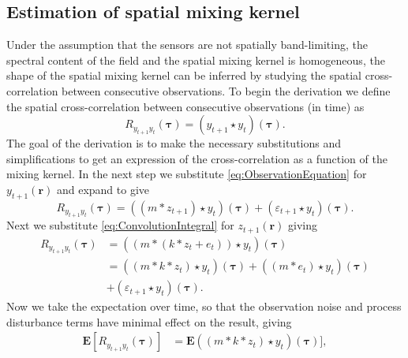 \documentclass[10pt,twocolumn,twoside]{IEEEtran}
\begin{document}
\subsection{Estimation of spatial mixing kernel} 
Under the assumption that the sensors are not spatially band-limiting, the spectral content of the field and the spatial mixing kernel is homogeneous, the shape of the spatial mixing kernel can be inferred by studying the spatial cross-correlation between consecutive observations.  To begin the derivation we define the spatial cross-correlation between consecutive observations (in time) as  
\begin{equation}
	R_{y_{t+1}y_t}(\boldsymbol{\tau}) = \left(y_{t+1}\star y_t\right)\left(\boldsymbol{\tau}\right).
\end{equation}
 The goal of the derivation is to make the necessary substitutions and simplifications to get an expression of the cross-correlation as a function of the mixing kernel. In the next step we substitute \eqref{eq:ObservationEquation} for $y_{t+1}(\mathbf{r})$ and expand to give
\begin{equation}
	R_{y_{t+1}y_t}\left(\boldsymbol{\tau}\right) = \left(\left(m \ast z_{t+1}\right)\star y_t\right)\left(\boldsymbol{\tau}\right) + \left(\varepsilon_{t+1} \star y_t\right)\left(\boldsymbol{\tau}\right).
\end{equation}
Next we substitute \eqref{eq:ConvolutionIntegral} for $z_{t+1}(\mathbf{r})$ giving 
\begin{align}
	R_{y_{t+1}y_t}(\boldsymbol{\tau}) &= (\left(m \ast \left(k\ast z_t + e_t\right)\right) \star y_t)(\boldsymbol{\tau})\nonumber\\
	&= \left(\left(m\ast k\ast z_t\right)\star y_t \right)(\boldsymbol{\tau}) + \left(\left(m\ast e_t\right)\star y_t \right)(\boldsymbol{\tau}) \nonumber \\
	&+ \left(\varepsilon_{t+1} \star y_t\right)\left(\boldsymbol{\tau}\right).
\end{align}
Now we take the expectation over time, so that the observation noise and process disturbance terms have minimal effect on the result, giving 
\begin{align}\label{eq:ExpectationToCancelNoise}
	\mathbf{E}[R_{y_{t+1}y_t}(\boldsymbol{\tau})] &= \mathbf{E} \left(\left(m\ast k\ast z_t\right)\star y_t \right)(\boldsymbol{\tau}) ],
\end{align}
\end{document}
